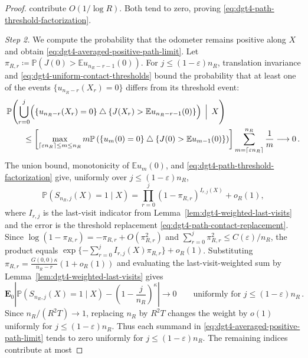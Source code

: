 \documentclass[11pt]{amsart}
\theoremstyle{plain}
\theoremstyle{definition}
\newcommand{\E}{\mathbb{E}}
\renewcommand{\P}{\mathbb{P}}
\begin{document}
\begin{proof}
	contribute $O(1/\log R)$. Both tend to zero, proving \eqref{eq:dgt4-path-threshold-factorization}.
	\par\smallskip\noindent\emph{Step 2.} We compute the probability that the
	odometer remains positive along $X$ and obtain
	\eqref{eq:dgt4-averaged-positive-path-limit}.
	Let
	$\pi_{R,r}\coloneqq\P(J(0)>\E u_{n_R-r-1}(0))$.
	For $j\leq(1-\varepsilon)n_R$, translation invariance and
	\eqref{eq:dgt4-uniform-contact-thresholds} bound the probability that at least
	one of the events $\{u_{n_R-r}(X_r)=0\}$ differs from its threshold event:
	\begin{equation}\label{eq:dgt4-path-contact-replacement}
	\begin{aligned}
	&\P\Biggl(
	\bigcup_{r=0}^j
	\Bigl(
	\{u_{n_R-r}(X_r)=0\}
	\mathbin{\triangle}
	\{J(X_r)>\E u_{n_R-r-1}(0)\}
	\Bigr)
	\,\Bigm|\,X\Biggr)\\
	&\qquad\leq
	\left[
	\max_{\lceil\varepsilon n_R\rceil\leq m\leq n_R}
	m\P\left(
	\{u_m(0)=0\}\mathbin{\triangle}
		\{J(0)>\E u_{m-1}(0)\}
		\right)
		\right]
	\sum_{m=\lceil\varepsilon n_R\rceil}^{n_R}\frac1m
	\longrightarrow0\, .
	\end{aligned}
	\end{equation}
		The union bound, monotonicity of $\E u_m(0)$, and
		\eqref{eq:dgt4-path-threshold-factorization} give, uniformly over
		$j\leq(1-\varepsilon)n_R$,
		\begin{equation}\label{eq:dgt4-path-product-limit}
			\P(S_{n_R,j}(X)=1\mid X)
			=\prod_{r=0}^j(1-\pi_{R,r})^{I_{r,j}(X)}+o_R(1),
		\end{equation}
		where $I_{r,j}$ is the last-visit indicator from
		Lemma~\ref{lem:dgt4-weighted-last-visits} and the error is the threshold
		replacement \eqref{eq:dgt4-path-contact-replacement}. Since
		$\log(1-\pi_{R,r})=-\pi_{R,r}+O(\pi_{R,r}^2)$ and $\sum_{r=0}^j\pi_{R,r}^2\leq C(\varepsilon)/n_R$,
		the product equals $\exp\{-\sum_{r=0}^j I_{r,j}(X)\pi_{R,r}\}+o_R(1)$. Substituting
		$\pi_{R,r}=\frac{G(0,0)\kappa}{n_R-r}(1+o_R(1))$ and evaluating the last-visit-weighted sum by
		Lemma~\ref{lem:dgt4-weighted-last-visits} gives
		\[
			\mathbf E_0\left|
			\P(S_{n_R,j}(X)=1\mid X)-\left(1-\frac{j}{n_R}\right)^\kappa
			\right|\longrightarrow0
			\qquad\text{uniformly for }j\leq(1-\varepsilon)n_R\, .
		\]
		Since $n_R/(R^2T)\to1$, replacing $n_R$ by $R^2T$ changes the weight by
		$o(1)$ uniformly for $j\leq(1-\varepsilon)n_R$. Thus each summand in
		\eqref{eq:dgt4-averaged-positive-path-limit} tends to zero uniformly for
		$j\leq(1-\varepsilon)n_R$. The remaining indices contribute at most

\end{proof}
\end{document}
